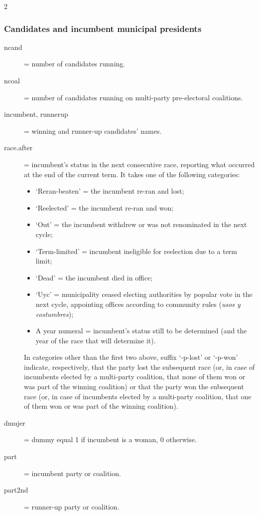\documentclass[letter,12pt]{article}
\begin{document}
\begin{singlespace}
\begin{multicols}{2}
\begin{footnotesize}
\subsubsection{Candidates and incumbent municipal presidents}
\begin{description}
\item[ncand] = number of candidates running.
\item[ncoal] = number of candidates running on multi-party pre-electoral coalitions. 
\item[incumbent, runnerup] = winning and runner-up candidates' names.
\item[race.after] = incumbent's status in the next consecutive race, reporting what occurred at the end of the current term. It takes one of the following categories:
  \begin{itemize}
  \item `Reran-beaten' = the incumbent re-ran and lost; 
  \item `Reelected' = the incumbent re-ran and won; 
  \item `Out' = the incumbent withdrew or was not renominated in the next cycle; 
  \item `Term-limited' = incumbent ineligible for reelection due to a term limit; 
  \item `Dead' = the incumbent died in office;
  \item `Uyc' = municipality ceased electing authorities by popular vote in the next cycle, appointing offices according to community rules (\emph{usos y costumbres});
  \item A year numeral = incumbent's status still to be determined (and the year of the race that will determine it).
  \end{itemize}
In categories other than the first two above, suffix `-p-lost' or `-p-won' indicate, respectively, that the party lost the subsequent race (or, in case of incumbents elected by a multi-party coalition, that none of them won or was part of the winning coalition) or that the party won the subsequent race (or, in case of incumbents elected by a multi-party coalition, that one of them won or was part of the winning coalition).
\item[dmujer] = dummy equal 1 if incumbent is a woman, 0 otherwise. 
\item[part] = incumbent party or coalition.
\item[part2nd] = runner-up party or coalition.
\end{description}

\end{footnotesize}
\end{multicols}
\end{singlespace}
\end{document}
